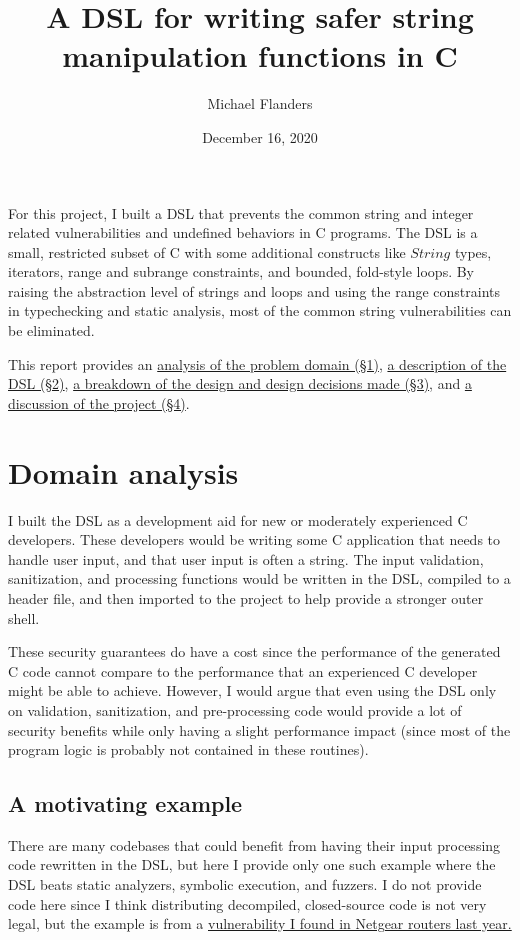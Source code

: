 \documentclass[letterpaper]{article}
\title{A DSL for writing safer string manipulation functions in C}
\author{Michael Flanders}
\date{December 16, 2020}
\begin{document}
\maketitle


For this project, I built a DSL that prevents the common string and
integer related vulnerabilities and undefined behaviors in C programs.
The DSL is a small, restricted subset of C with some additional constructs
like $String$ types, iterators, range and subrange constraints, and bounded,
fold-style loops. By raising the abstraction level of strings and loops
and using the range constraints in typechecking and static analysis,
most of the common string vulnerabilities can be eliminated.

This report provides an \hyperref[sec:domain]{analysis of the problem domain (\S1)},
\hyperref[sec:language]{a description of the DSL (\S2)},
\hyperref[sec:design]{a breakdown of the design and design decisions made (\S3)},
and \hyperref[sec:discussion]{a discussion of the project (\S4)}.

\section{Domain analysis}
\label{sec:domain}

I built the DSL as a development aid for new or moderately experienced
C developers. These developers would be writing some C application
that needs to handle user input, and that user input is often a string.
The input validation, sanitization, and processing functions would be
written in the DSL, compiled to a header file, and then imported to
the project to help provide a stronger outer shell.

These security guarantees do have a cost since the performance of the
generated C code cannot compare to the performance that an experienced
C developer might be able to achieve. However, I would argue that even
using the DSL only on validation, sanitization, and pre-processing code would
provide a lot of security benefits while only having a slight performance
impact (since most of the program logic is probably not contained in these
routines).

\subsection{A motivating example}

There are many codebases that could benefit from having their input processing
code rewritten in the DSL, but here I provide only one such example where the
DSL beats static analyzers, symbolic execution, and fuzzers. I do not
provide code here since I think distributing decompiled, closed-source code
is not very legal, but the example is from a \href{https://www.zerodayinitiative.com/advisories/ZDI-19-866/}
{vulnerability I found in Netgear routers last year.}
\end{document}
